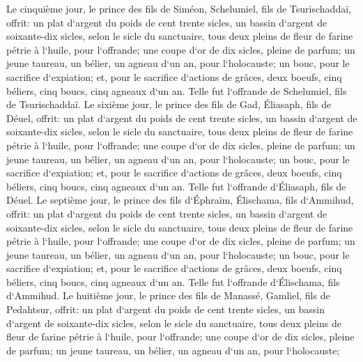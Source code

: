 \verse Le cinquième jour, le prince des fils de Siméon, Schelumiel, fils de Tsurischaddaï, 
\verse offrit: un plat d`argent du poids de cent trente sicles, un bassin d`argent de soixante-dix sicles, selon le sicle du sanctuaire, tous deux pleins de fleur de farine pétrie à l`huile, pour l`offrande; 
\verse une coupe d`or de dix sicles, pleine de parfum; 
\verse un jeune taureau, un bélier, un agneau d`un an, pour l`holocauste; 
\verse un bouc, pour le sacrifice d`expiation; 
\verse et, pour le sacrifice d`actions de grâces, deux boeufs, cinq béliers, cinq boucs, cinq agneaux d`un an. Telle fut l`offrande de Schelumiel, fils de Tsurischaddaï. 
\verse Le sixième jour, le prince des fils de Gad, Éliasaph, fils de Déuel, 
\verse offrit: un plat d`argent du poids de cent trente sicles, un bassin d`argent de soixante-dix sicles, selon le sicle du sanctuaire, tous deux pleins de fleur de farine pétrie à l`huile, pour l`offrande; 
\verse une coupe d`or de dix sicles, pleine de parfum; 
\verse un jeune taureau, un bélier, un agneau d`un an, pour l`holocauste; 
\verse un bouc, pour le sacrifice d`expiation; 
\verse et, pour le sacrifice d`actions de grâces, deux boeufs, cinq béliers, cinq boucs, cinq agneaux d`un an. Telle fut l`offrande d`Éliasaph, fils de Déuel. 
\verse Le septième jour, le prince des fils d`Éphraïm, Élischama, fils d`Ammihud, 
\verse offrit: un plat d`argent du poids de cent trente sicles, un bassin d`argent de soixante-dix sicles, selon le sicle du sanctuaire, tous deux pleins de fleur de farine pétrie à l`huile, pour l`offrande; 
\verse une coupe d`or de dix sicles, pleine de parfum; 
\verse un jeune taureau, un bélier, un agneau d`un an, pour l`holocauste; 
\verse un bouc, pour le sacrifice d`expiation; 
\verse et, pour le sacrifice d`actions de grâces, deux boeufs, cinq béliers, cinq boucs, cinq agneaux d`un an. Telle fut l`offrande d`Élischama, fils d`Ammihud. 
\verse Le huitième jour, le prince des fils de Manassé, Gamliel, fils de Pedahtsur, 
\verse offrit: un plat d`argent du poids de cent trente sicles, un bassin d`argent de soixante-dix sicles, selon le sicle du sanctuaire, tous deux pleins de fleur de farine pétrie à l`huile, pour l`offrande; 
\verse une coupe d`or de dix sicles, pleine de parfum; 
\verse un jeune taureau, un bélier, un agneau d`un an, pour l`holocauste; 
